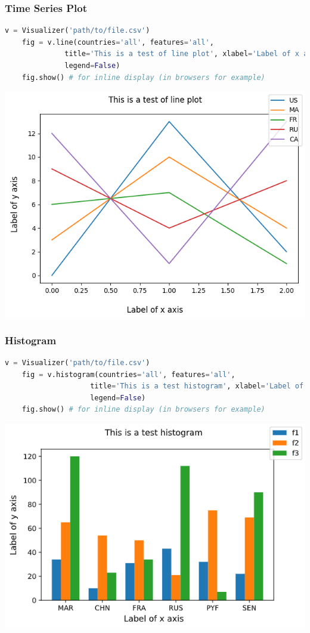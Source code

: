 \begin{frame}[fragile,shrink=30]
  \frametitle{Time Series Plot}
  \begin{lstlisting}[language=Python]
    v = Visualizer('path/to/file.csv')
    fig = v.line(countries='all', features='all',
              title='This is a test of line plot', xlabel='Label of x axis', ylabel='Label of y axis', 
              legend=False)
    fig.show() # for inline display (in browsers for example)
      \end{lstlisting}
    \begin{center}
    \includegraphics[scale=0.6]{beamer/inc/graphics/line.png}
    \end{center}
\end{frame}

\begin{frame}[fragile,shrink=30]
  \frametitle{Histogram}
    \begin{lstlisting}[language=Python]
    v = Visualizer('path/to/file.csv')
    fig = v.histogram(countries='all', features='all',
                    title='This is a test histogram', xlabel='Label of x axis', ylabel='Label of y axis', 
                    legend=False)
    fig.show() # for inline display (in browsers for example)
    \end{lstlisting}
    \begin{center}
    \includegraphics[scale=0.6]{beamer/inc/graphics/histogram.png}
    \end{center}
\end{frame}